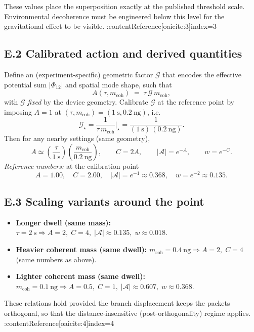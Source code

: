 \documentclass[11pt,letterpaper]{article}
\begin{document}
These values place the superposition exactly at the published threshold scale. Environmental decoherence must be engineered below this level for the gravitational effect to be visible. :contentReference[oaicite:3]{index=3}

\subsection*{E.2 Calibrated action and derived quantities}

Define an (experiment-specific) geometric factor \(\mathcal G\) that encodes the effective potential sum \(|\Phi_{12}|\) and spatial mode shape, such that
\[
A(\tau,m_{\mathrm{coh}})\;=\;\tau\,\mathcal G\,m_{\mathrm{coh}},
\]
with \(\mathcal G\) \emph{fixed} by the device geometry. Calibrate \(\mathcal G\) at the reference point by imposing \(A=1\) at \((\tau,m_{\mathrm{coh}})=(1~\mathrm{s},0.2~\mathrm{ng})\), i.e.
\[
\mathcal G_{\star}=\frac{1}{\tau\,m_{\mathrm{coh}}}\Big|_{\star}
=\frac{1}{(1~\mathrm{s})\,(0.2~\mathrm{ng})}.
\]
Then for any nearby settings (same geometry),
\[
A\simeq \left(\frac{\tau}{1~\mathrm{s}}\right)\!\left(\frac{m_{\mathrm{coh}}}{0.2~\mathrm{ng}}\right),\qquad
C=2A,\qquad
|\mathcal A|=e^{-A},\qquad
w=e^{-C}.
\]
\emph{Reference numbers:} at the calibration point
\[
A=1.00,\quad C=2.00,\quad |\mathcal A|=e^{-1}\approx 0.368,\quad w=e^{-2}\approx 0.135.
\]

\subsection*{E.3 Scaling variants around the point}

\begin{itemize}
\item \textbf{Longer dwell (same mass):} \(\tau=2~\mathrm{s}\Rightarrow A=2,\; C=4,\; |\mathcal A|\approx 0.135,\; w\approx 0.018\).
\item \textbf{Heavier coherent mass (same dwell):} \(m_{\mathrm{coh}}=0.4~\mathrm{ng}\Rightarrow A=2,\; C=4\) (same numbers as above).
\item \textbf{Lighter coherent mass (same dwell):} \(m_{\mathrm{coh}}=0.1~\mathrm{ng}\Rightarrow A=0.5,\; C=1,\; |\mathcal A|\approx 0.607,\; w\approx 0.368\).
\end{itemize}

These relations hold provided the branch displacement keeps the packets orthogonal, so that the distance-insensitive (post-orthogonality) regime applies. :contentReference[oaicite:4]{index=4}
\end{document}
